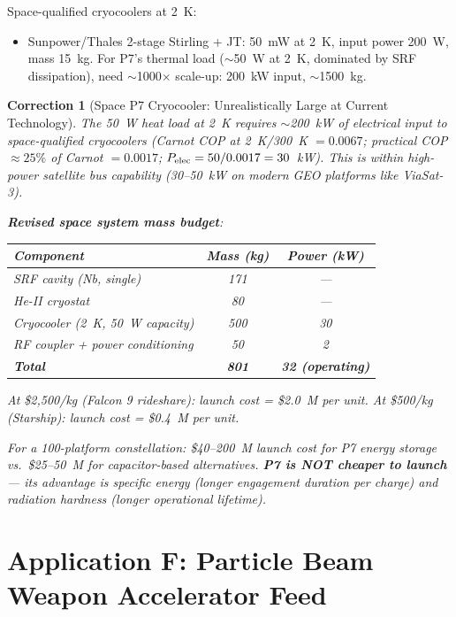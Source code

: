 \documentclass[11pt]{article}
\newtheorem{correction}{Correction}
\begin{document}
Space-qualified cryocoolers at 2~K:
\begin{itemize}[nosep]
  \item Sunpower/Thales 2-stage Stirling + JT: 50~mW at 2~K,
    input power 200~W, mass 15~kg. For P7's thermal load
    ($\sim$50~W at 2~K, dominated by SRF dissipation), need
    $\sim$1000$\times$ scale-up: 200~kW input, $\sim$1500~kg.
\end{itemize}

\begin{correction}[Space P7 Cryocooler: Unrealistically Large at Current Technology]
\label{corr:space-cryo}
The 50~W heat load at 2~K requires $\sim$200~kW of electrical input
to space-qualified cryocoolers (Carnot COP at 2~K/300~K $= 0.0067$;
practical COP $\approx 25\%$ of Carnot $= 0.0017$; $P_{\rm elec}
= 50/0.0017 = 30$~kW). This is within high-power satellite bus
capability (30--50~kW on modern GEO platforms like ViaSat-3).

\textbf{Revised space system mass budget}:
\begin{center}
\begin{tabular}{lcc}
\toprule
Component & Mass (kg) & Power (kW) \\
\midrule
SRF cavity (Nb, single) & 171 & --- \\
He-II cryostat & 80 & --- \\
Cryocooler (2~K, 50~W capacity) & 500 & 30 \\
RF coupler + power conditioning & 50 & 2 \\
\midrule
\textbf{Total} & \textbf{801} & \textbf{32 (operating)} \\
\bottomrule
\end{tabular}
\end{center}

At \$2,500/kg (Falcon 9 rideshare): launch cost = \$2.0~M per unit.
At \$500/kg (Starship): launch cost = \$0.4~M per unit.

For a 100-platform constellation: \$40--200~M launch cost for P7
energy storage vs.\ \$25--50~M for capacitor-based alternatives.
\textbf{P7 is NOT cheaper to launch} --- its advantage is specific
energy (longer engagement duration per charge) and radiation hardness
(longer operational lifetime).
\end{correction}

\section{Application F: Particle Beam Weapon Accelerator Feed}
\label{sec:PBW}
\end{document}
